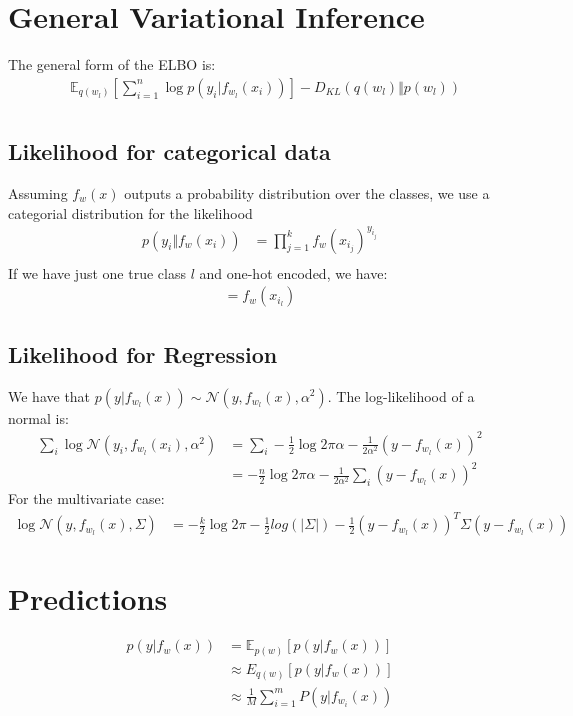 \documentclass[a4paper]{scrartcl}
\begin{document}
\section{General Variational Inference}
    The general form of the ELBO is:
    \begin{align*}
        & \mathbb{E}_{q(w_l)}[\sum_{i=1}^n \log{p(y_i \vert f_{w_l}(x_i))}] - D_{KL}(q(w_l) \Vert p(w_l))\\
    \end{align*}

  \subsection{Likelihood for categorical data}
      Assuming $f_w(x)$ outputs a probability distribution over the classes, we use a categorial distribution for the likelihood
      \begin{align*}
          p(y_i \Vert f_w(x_i))
          &= \prod_{j=1}^k f_w(x_{i_j})^{y_{i_j}} \\
      \end{align*}
      If we have just one true class $l$ and one-hot encoded, we have:
      \begin{align*}
          = f_w(x_{i_l})
      \end{align*}

    \subsection{Likelihood for Regression}
      We have that $p(y \vert f_{w_l}(x)) \sim \mathcal{N}(y,
      f_{w_l}(x), \alpha^2)$. The log-likelihood of a normal is:
      \begin{align*}
        \sum_i \log{\mathcal{N}(y_i,f_{w_l}(x_i), \alpha^2)}
        &= \sum_i -\frac{1}{2}\log{2\pi \alpha} - \frac{1}{2\alpha^2} (y- f_{w_l}(x))^2\\
        &= -\frac{n}{2}\log{2\pi \alpha} - \frac{1}{2\alpha^2} \sum_i (y- f_{w_l}(x))^2
      \end{align*}
      For the multivariate case:
      \begin{align*}
        \log{\mathcal{N}(y,f_{w_l}(x), \Sigma)}
        &= -\frac{k}{2}\log{2\pi} - \frac{1}{2} log(\vert \Sigma \vert) - \frac{1}{2}(y - f_{w_l}(x))^T \Sigma (y - f_{w_l}(x))
      \end{align*}

  \section{Predictions}
  \begin{align*}
      p(y \vert f_w(x)) 
      &= \mathbb{E}_{p(w)}[p(y \vert f_w(x))]\\
      &\approx E_{q(w)}[p(y \vert f_w(x))]\\
      &\approx \frac{1}{M}\sum_{i=1}^m P(y \vert f_{w_i}(x))
  \end{align*}
\end{document}
